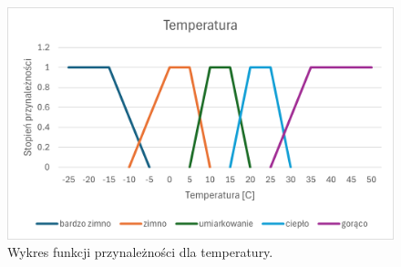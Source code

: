 \documentclass{article}
\begin{document}
\begin{enumerate}
        \begin{figure}[H]
    \centering
    \includegraphics[width=\textwidth]{img/temp.png}
    \caption{Wykres funkcji przynależności dla temperatury.}
    \end{figure}


\end{enumerate}
\end{document}

